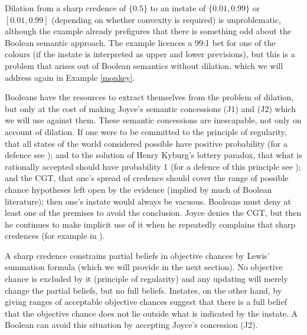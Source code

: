 \documentclass[11pt]{article}
\begin{document}
\addtocounter{expls}{1}


Dilation from a sharp credence of $\{0.5\}$ to an instate of
$\{0.01,0.99\}$ or $[0.01,0.99]$ (depending on whether convexity is
required) is unproblematic, although the example already prefigures
that there is something odd about the Boolean semantic approach. The
example licences a 99:1 bet for one of the colours (if the instate is
interpreted as upper and lower previsions), but this is a problem that
arises out of Boolean semantics without dilation, which we will
address again in Example \ref{monkey}.

Booleans have the resources to extract themselves from the problem of
dilation, but only at the cost of making Joyce's semantic concessions
(J1) and (J2) which we will use against them. These semantic
concessions are inescapable, not only on account of dilation. If one
were to be committed to the principle of regularity, that all states
of the world considered possible have positive probability (for a
defence see ); and to the solution of Henry
Kyburg's lottery paradox, that what is rationally accepted should have
probability 1 (for a defence of this principle see
); and the CGT, that one's spread of
credence should cover the range of possible chance hypotheses left
open by the evidence (implied by much of Boolean literature); then
one's instate would always be vacuous. Booleans must deny at least one
of the premises to avoid the conclusion. Joyce denies the CGT, but
then he continues to make implicit use of it when he repeatedly
complains that sharp credences  (for example
in ).

A sharp credence constrains partial beliefs in objective chances by
Lewis' summation formula (which we will provide in the next section).
No objective chance is excluded by it (principle of regularity) and
any updating will merely change the partial beliefs, but no full
beliefs. Instates, on the other hand, by giving ranges of acceptable
objective chances suggest that there is a full belief that the
objective chance does not lie outside what is indicated by the
instate. A Boolean can avoid this situation by accepting Joyce's
concession (J2).
\end{document}
